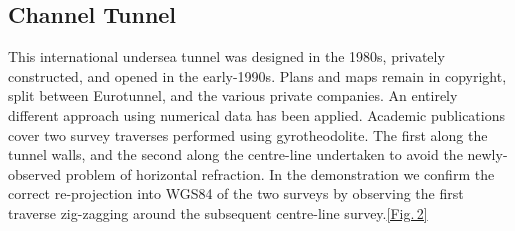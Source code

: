 \documentclass[conference,a4paper]{IEEEtran}
\begin{document}
\vspace{-1.7em}\subsection{Channel Tunnel}\vspace{-0.2em}

This international undersea tunnel was designed in the 1980s,
privately constructed, and opened in the early-1990s.  Plans and maps
remain in copyright, split between Eurotunnel, and the various private
companies.  An entirely different approach using numerical data has
been applied.\cite{osm-wiki-chunnel}\nocite{sladen-sotm2013} Academic publications cover two
survey traverses performed using gyrotheodolite.\cite{korittke-1997}
The first along the tunnel walls, and the second along the centre-line
undertaken to avoid the newly-observed problem of horizontal
refraction.\cite{korittke-1989}\hspace{3em} In the demonstration we confirm the
correct re-projection into WGS84 of the two surveys by observing the
first traverse zig-zagging around the subsequent centre-line survey.\hfill\hyperref[fig:osm-chunnel-traverse]{[Fig.\,2]}
\end{document}
